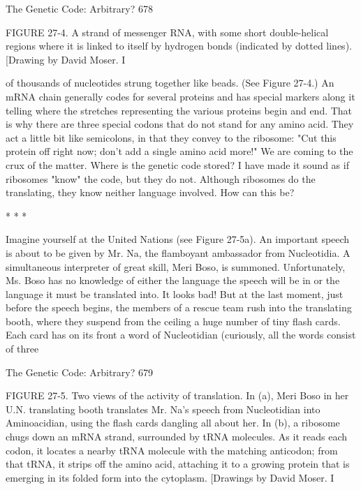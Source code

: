 The Genetic Code: Arbitrary?                                                         678

FIGURE 27-4. A strand of messenger RNA, with some short double-helical regions
where it is linked to itself by hydrogen bonds (indicated by dotted lines). [Drawing by
David Moser. I

of thousands of nucleotides strung together like beads. (See Figure 27-4.) An mRNA
chain generally codes for several proteins and has special markers along it telling
where the stretches representing the various proteins begin and end. That is why there
are three special codons that do not stand for any amino acid. They act a little bit like
semicolons, in that they convey to the ribosome: "Cut this protein off right now; don't
add a single amino acid more!"
        We are coming to the crux of the matter. Where is the genetic code stored? I
have made it sound as if ribosomes "know" the code, but they do not. Although
ribosomes do the translating, they know neither language involved. How can this be?

                                       *   *   *


         Imagine yourself at the United Nations (see Figure 27-5a). An important
speech is about to be given by Mr. Na, the flamboyant ambassador from Nucleotidia.
A simultaneous interpreter of great skill, Meri Boso, is summoned. Unfortunately,
Ms. Boso has no knowledge of either the language the speech will be in or the
language it must be translated into. It looks bad! But at the last moment, just before
the speech begins, the members of a rescue team rush into the translating booth,
where they suspend from the ceiling a huge number of tiny flash cards. Each card has
on its front a word of Nucleotidian (curiously, all the words consist of three




The Genetic Code: Arbitrary?                                                         679

FIGURE 27-5. Two views of the activity of translation. In (a), Meri Boso in her U.N.
translating booth translates Mr. Na's speech from Nucleotidian into Aminoacidian,
using the flash cards dangling all about her. In (b), a ribosome chugs down an mRNA
strand, surrounded by tRNA molecules. As it reads each codon, it locates a nearby
tRNA molecule with the matching anticodon; from that tRNA, it strips off the amino
acid, attaching it to a growing protein that is emerging in its folded form into the
cytoplasm. [Drawings by David Moser. I


